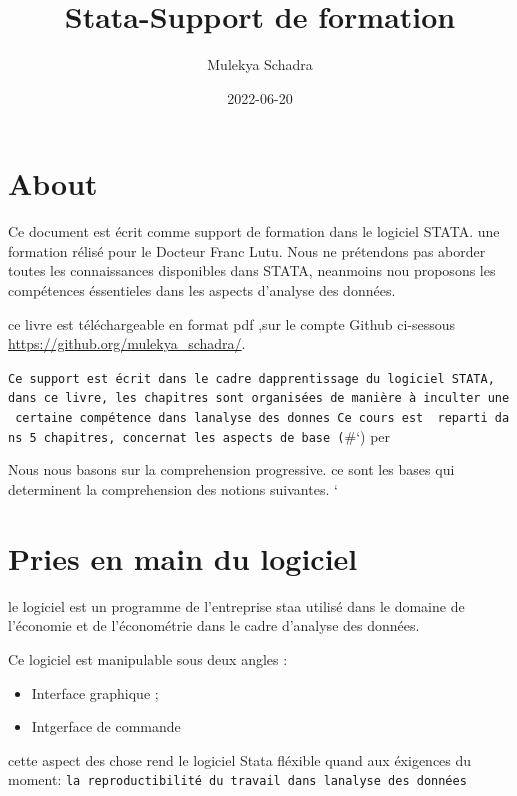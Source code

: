 \documentclass[
]{book}
\title{Stata-Support de formation}
\author{Mulekya Schadra}
\date{2022-06-20}
\providecommand{\tightlist}{%
  \setlength{\itemsep}{0pt}\setlength{\parskip}{0pt}}
\begin{document}
\maketitle

{
\setcounter{tocdepth}{1}
\tableofcontents
}
\hypertarget{about}{%
\chapter*{About}\label{about}}

Ce document est écrit comme support de formation dans le logiciel STATA. une formation rélisé pour le Docteur Franc Lutu.
Nous ne prétendons pas aborder toutes les connaissances disponibles dans STATA,
neanmoins nou proposons les compétences éssentieles dans les aspects d'analyse des données.

ce livre est téléchargeable en format pdf ,sur le compte Github ci-sessous \url{https://github.org/mulekya_schadra/}.

\texttt{Ce\ support\ est\ écrit\ dans\ le\ cadre\ d\textquotesingle{}apprentissage\ du\ logiciel\ STATA,\ \ dans\ ce\ livre,\ les\ chapitres\ sont\ organisées\ de\ manière\ à\ inculter\ une\ certaine\ compétence\ dans\ l\textquotesingle{}analyse\ des\ donnes\ Ce\ cours\ est\ \ reparti\ dans\ 5\ chapitres,\ concernat\ les\ aspects\ de\ base\ (}\#`) per

Nous nous basons sur la comprehension progressive. ce sont les bases qui determinent la comprehension des notions suivantes. `

\hypertarget{pries-en-main-du-logiciel}{%
\chapter{Pries en main du logiciel}\label{pries-en-main-du-logiciel}}

le logiciel est un programme de l'entreprise staa utilisé dans le domaine de l'économie et de l'économétrie dans le cadre d'analyse des données.

Ce logiciel est manipulable sous deux angles :

\begin{itemize}
\tightlist
\item
  Interface graphique ;
\item
  Intgerface de commande
\end{itemize}

cette aspect des chose rend le logiciel Stata fléxible quand aux éxigences du moment: \texttt{la\ reproductibilité\ du\ travail\ dans\ l\textquotesingle{}analyse\ des\ données}
\end{document}

